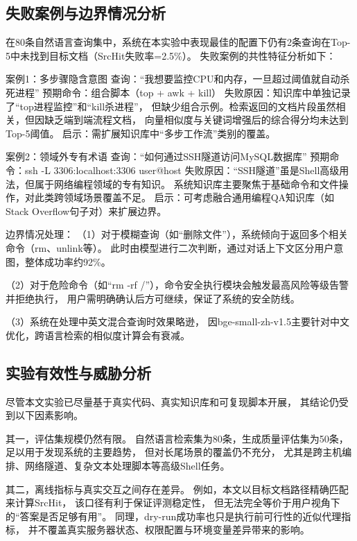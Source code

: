 \subsection{失败案例与边界情况分析}

在80条自然语言查询集中，系统在本实验中表现最佳的配置下仍有2条查询在Top-5中未找到目标文档（SrcHit失败率=2.5\%）。
失败案例的共性特征分析如下：

案例1：多步骤隐含意图
查询：“我想要监控CPU和内存，一旦超过阈值就自动杀死进程”
预期命令：组合脚本（top + awk + kill）
失败原因：知识库中单独记录了“top进程监控”和“kill杀进程”，
但缺少组合示例。检索返回的文档片段虽然相关，但因缺乏端到端流程文档，
向量相似度与关键词增强后的综合得分均未达到Top-5阈值。
启示：需扩展知识库中“多步工作流”类别的覆盖。

案例2：领域外专有术语
查询：“如何通过SSH隧道访问MySQL数据库”
预期命令：ssh -L 3306:localhost:3306 user@host
失败原因：“SSH隧道”虽是Shell高级用法，但属于网络编程领域的专有知识。
系统知识库主要聚焦于基础命令和文件操作，对此类跨领域场景覆盖不足。
启示：可考虑融合通用编程QA知识库（如Stack Overflow句子对）来扩展边界。

边界情况处理：
（1）对于模糊查询（如“删除文件”），系统倾向于返回多个相关命令（rm、unlink等）。
此时由模型进行二次判断，通过对话上下文区分用户意图，整体成功率约92\%。

（2）对于危险命令（如“rm -rf /”），命令安全执行模块会触发最高风险等级告警并拒绝执行，
用户需明确确认后方可继续，保证了系统的安全防线。

（3）系统在处理中英文混合查询时效果略逊，
因bge-small-zh-v1.5主要针对中文优化，跨语言检索的相似度计算会有衰减。

\subsection{实验有效性与威胁分析}

尽管本文实验已尽量基于真实代码、真实知识库和可复现脚本开展，
其结论仍受到以下因素影响。

其一，评估集规模仍然有限。
自然语言检索集为80条，生成质量评估集为50条，
足以用于发现系统的主要趋势，
但对长尾场景的覆盖仍不充分，
尤其是跨主机编排、网络隧道、复杂文本处理脚本等高级Shell任务。

其二，离线指标与真实交互之间存在差异。
例如，本文以目标文档路径精确匹配来计算SrcHit，
该口径有利于保证评测稳定性，
但无法完全等价于用户视角下的``答案是否足够有用''。
同理，dry-run成功率也只是执行前可行性的近似代理指标，
并不覆盖真实服务器状态、权限配置与环境变量差异带来的影响。

